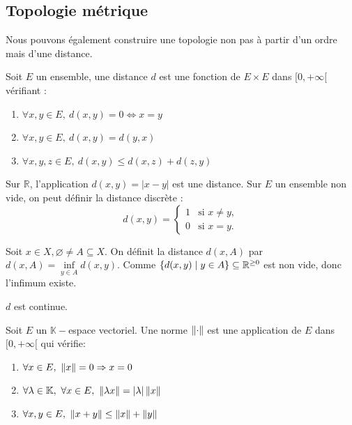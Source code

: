 \subsection{Topologie métrique}
Nous pouvons également construire une topologie non pas à partir d'un ordre mais d'une distance.
\begin{definition}[Distance]
    Soit $E$ un ensemble, une distance $d$ est une fonction de $E\times E$ dans $[0,+\infty[$ vérifiant :
    \begin{enumerate}
        \item $\forall x,y\in E,\ d(x,y)=0 \Leftrightarrow x=y$
        \item $\forall x,y\in E,\ d(x,y)=d(y,x)$
        \item $\forall x,y,z \in E,\ d(x,y)\leq d(x,z)+d(z,y)$
    \end{enumerate}
\end{definition}
\begin{exemple}
Sur $\mathbb{R}$, l'application $d(x,y)=|x-y|$ est une distance. Sur $E$ un ensemble non vide, on peut définir la distance discrète :
\begin{equation*}
    d(x,y)=\begin{cases}
1 & \text{si } x \neq y, \\
0 & \text{si } x = y.
\end{cases}
\end{equation*}
\end{exemple}
\begin{definition}
    Soit $x\in X, \varnothing\ne A\subseteq X$. On définit la distance $d(x,A)$ par $d(x,A) = \inf\limits_{y\in A}d(x,y)$.
    Comme $\{d(x,y)\mid y \in A\}\subseteq\mathbb{R}^{\ge0}$ est non vide, donc l'infimum existe.
\end{definition}
\begin{remarque}
    $d$ est continue.
\end{remarque}
\begin{definition}[Norme]
    Soit $E$ un $\mathbb{K}-$espace vectoriel. Une norme $\left\| \cdot \right\|$ est une application de $E$ dans $[0,+\infty[$ qui vérifie:
    \begin{enumerate}
        \item $\forall x\in E,\ \left\| x \right\|=0 \Rightarrow x=0$
        \item $\forall\lambda\in \mathbb{K},\ \forall x\in E,\ \left\| \lambda x \right\|=|\lambda|\left\| x \right\|$
        \item $\forall x,y\in E,\ \left\| x+y \right\|\leq \left\| x \right\|+\left\| y \right\|$
    \end{enumerate}
\end{definition}
